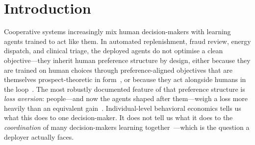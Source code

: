 %

\section{Introduction}
\label{sec:intro}

Cooperative systems increasingly mix human decision-makers with learning agents
trained to act like them. In automated replenishment, fraud review, energy
dispatch, and clinical triage, the deployed agents do not optimise a clean
objective---they inherit human preference structure by design, either because
they are trained on human choices through preference-aligned objectives that are
themselves prospect-theoretic in form~\citep{ethayarajh2024kto}, or because they
act alongside humans in the loop~\citep{lalmohammed2025}. The most robustly
documented feature of that preference structure is \emph{loss aversion}:
people---and now the agents shaped after them---weigh a loss more heavily than an
equivalent gain~\citep{kahneman1979,tversky1992}. Individual-level behavioral
economics tells us what this does to one decision-maker. It does not tell us what
it does to the \emph{coordination} of many decision-makers learning
together~\citep{leibo2017multi,lowe2017multi}---which is the question a deployer
actually faces.

